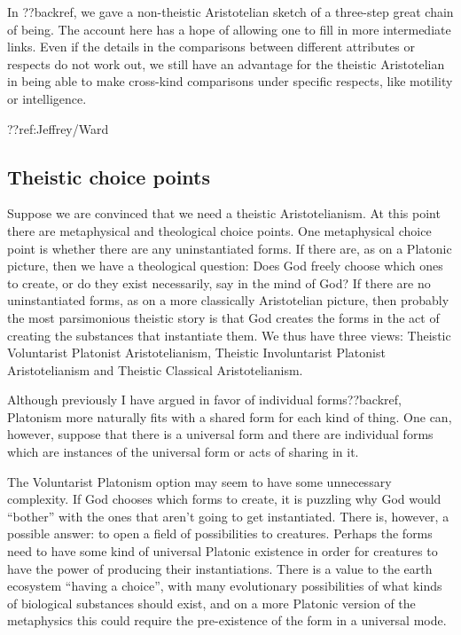 In ??backref, we gave a non-theistic Aristotelian sketch of a three-step great chain of being. The account here has
a hope of allowing one to fill in more intermediate links.
Even if the details in the comparisons between different attributes or respects do not work out, we still have an advantage 
for the theistic Aristotelian in being able to make cross-kind comparisons under specific respects, like motility or intelligence.

??ref:Jeffrey/Ward

\subsection{Theistic choice points}
Suppose we are convinced that we need a theistic Aristotelianism.
At this point there are metaphysical and theological choice points. One metaphysical choice point is whether there are any
uninstantiated forms. If there are, as on a Platonic picture, then we have a theological question: Does God freely choose which ones
to create, or do they exist necessarily, say in the mind of God? If there are no uninstantiated forms, as on a more classically 
Aristotelian picture, then probably the most parsimonious theistic story is that God creates the forms in the act of creating the substances 
that instantiate them. We thus have three views: Theistic Voluntarist Platonist Aristotelianism, Theistic Involuntarist Platonist Aristotelianism
and Theistic Classical Aristotelianism.

Although previously I have argued in favor of individual forms??backref, Platonism more
naturally fits with a shared form for each kind of thing. One can, however, suppose that there is a universal form
and there are individual forms which are instances of the universal form or acts of sharing in it.

The Voluntarist Platonism option may seem to have some unnecessary complexity. If God chooses which forms to create, it is 
puzzling why God would ``bother'' with the ones that aren't going to get instantiated. There is, however, a possible answer:
to open a field of possibilities to creatures. Perhaps the forms need to have some kind of universal Platonic existence in order for
creatures to have the power of producing their instantiations. There is a value to the earth ecosystem ``having a choice'', with
many evolutionary possibilities of what kinds of biological substances should exist, and on a more Platonic version of the 
metaphysics this could require the pre-existence of the form in a universal mode. 

